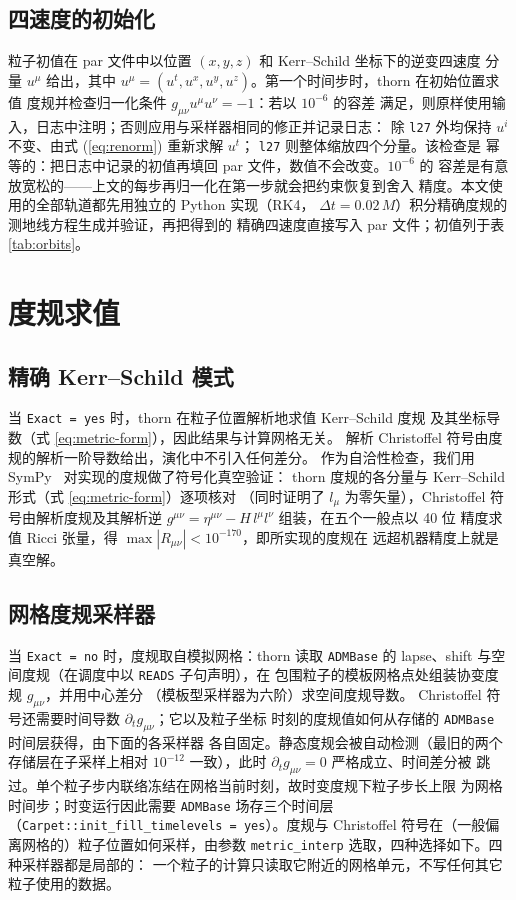\documentclass[11pt,UTF8]{ctexart}
\begin{document}
\subsection{四速度的初始化}

粒子初值在 par 文件中以位置 $(x,y,z)$ 和 Kerr--Schild 坐标下的逆变四速度
分量 $u^\mu$ 给出，其中 $u^\mu=(u^t,u^x,u^y,u^z)$。第一个时间步时，thorn 在初始位置求值
度规并检查归一化条件 $g_{\mu\nu}u^\mu u^\nu = -1$：若以 $10^{-6}$ 的容差
满足，则原样使用输入，日志中注明；否则应用与采样器相同的修正并记录日志：
除 \texttt{l27} 外均保持 $u^i$ 不变、由式 (\ref{eq:renorm}) 重新求解 $u^t$；
\texttt{l27} 则整体缩放四个分量。该检查是
幂等的：把日志中记录的初值再填回 par 文件，数值不会改变。$10^{-6}$ 的
容差是有意放宽松的——上文的每步再归一化在第一步就会把约束恢复到舍入
精度。本文使用的全部轨道都先用独立的 Python 实现（RK4，
$\Delta t = 0.02\,M$）积分精确度规的测地线方程生成并验证，再把得到的
精确四速度直接写入 par 文件；初值列于表 \ref{tab:orbits}。

\section{度规求值}\label{sec:metric}

\subsection{精确 Kerr--Schild 模式}\label{sec:exactmetric}

当 \texttt{Exact = yes} 时，thorn 在粒子位置解析地求值 Kerr--Schild 度规
及其坐标导数（式 \ref{eq:metric-form}），因此结果与计算网格无关。
解析 Christoffel 符号由度规的解析一阶导数给出，演化中不引入任何差分。
作为自洽性检查，我们用 SymPy~\citep{sympy} 对实现的度规做了符号化真空验证：
thorn 度规的各分量与 Kerr--Schild 形式（式 \ref{eq:metric-form}）逐项核对
（同时证明了 $l_\mu$ 为零矢量），Christoffel 符号由解析度规及其解析逆
$g^{\mu\nu} = \eta^{\mu\nu} - H\,l^\mu l^\nu$ 组装，在五个一般点以 40 位
精度求值 Ricci 张量，得 $\max|R_{\mu\nu}| < 10^{-170}$，即所实现的度规在
远超机器精度上就是真空解。

\subsection{网格度规采样器}\label{sec:samplers}

当 \texttt{Exact = no} 时，度规取自模拟网格：thorn 读取 \texttt{ADMBase}
的 lapse、shift 与空间度规（在调度中以 \texttt{READS} 子句声明），在
包围粒子的模板网格点处组装协变度规 $g_{\mu\nu}$，并用中心差分
（模板型采样器为六阶）求空间度规导数。
Christoffel 符号还需要时间导数 $\partial_t g_{\mu\nu}$；它以及粒子坐标
时刻的度规值如何从存储的 \texttt{ADMBase} 时间层获得，由下面的各采样器
各自固定。静态度规会被自动检测（最旧的两个存储层在子采样上相对
$10^{-12}$ 一致），此时 $\partial_t g_{\mu\nu} = 0$ 严格成立、时间差分被
跳过。单个粒子步内联络冻结在网格当前时刻，故时变度规下粒子步长上限
为网格时间步；时变运行因此需要 \texttt{ADMBase} 场存三个时间层
（\texttt{Carpet::init\_fill\_timelevels = yes}）。度规与 Christoffel
符号在（一般偏离网格的）粒子位置如何采样，由参数
\texttt{metric\_interp} 选取，四种选择如下。四种采样器都是局部的：
一个粒子的计算只读取它附近的网格单元，不写任何其它粒子使用的数据。
\end{document}
